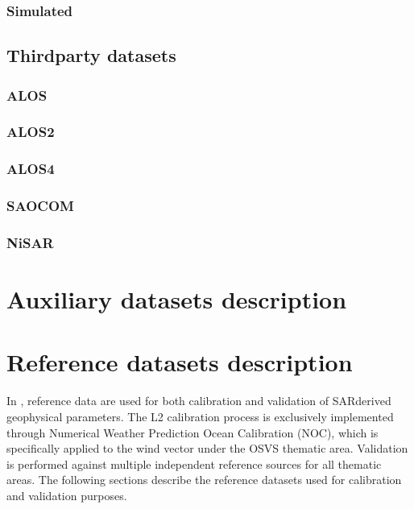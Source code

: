 \documentclass[a4paper,10pt,english]{sphinxmanual}
\begin{document}
\subsection{Simulated}
\label{\detokenize{03_lband_sar_datasets:simulated}}

\section{Third\sphinxhyphen{}party datasets}
\label{\detokenize{03_lband_sar_datasets:third-party-datasets}}

\subsection{ALOS}
\label{\detokenize{03_lband_sar_datasets:alos}}

\subsection{ALOS\sphinxhyphen{}2}
\label{\detokenize{03_lband_sar_datasets:alos-2}}

\subsection{ALOS\sphinxhyphen{}4}
\label{\detokenize{03_lband_sar_datasets:alos-4}}

\subsection{SAOCOM}
\label{\detokenize{03_lband_sar_datasets:saocom}}

\subsection{NiSAR}
\label{\detokenize{03_lband_sar_datasets:nisar}}
\sphinxstepscope


\chapter{Auxiliary datasets description}
\label{\detokenize{04_auxiliary_datasets:auxiliary-datasets-description}}\label{\detokenize{04_auxiliary_datasets::doc}}
\sphinxstepscope


\chapter{Reference datasets description}
\label{\detokenize{05_reference_datasets:reference-datasets-description}}\label{\detokenize{05_reference_datasets:sec-ref}}\label{\detokenize{05_reference_datasets::doc}}
\sphinxAtStartPar
In , reference data are used for both calibration and validation of SAR\sphinxhyphen{}derived geophysical parameters. The L2 calibration process is exclusively implemented through Numerical Weather Prediction Ocean Calibration (NOC), which is specifically applied to the wind vector under the OSVS thematic area. Validation is performed against multiple independent reference sources for all thematic areas. The following sections describe the reference datasets used for calibration and validation purposes.
\end{document}
